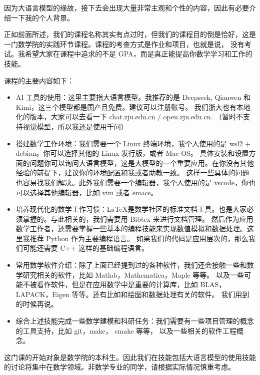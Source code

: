 \documentclass{ctexbook}
\numberwithin{theorem}{chapter}
\begin{document}
因为大语言模型的缘故，接下去会出现大量非常主观和个性的内容，因此有必要介绍一下我的个人背景。

正如前面所述，我们的课程名称其实有点过时，但我们的课程目的倒是恰好，这是一门数学院的实践环节课程。课程的考查方式是作业和项目，也就是说，
没有考试。我希望大家在课程中追求的不是 GPA，而是真正能提高你数学学习和工作的技能。

课程的主要内容如下：
\begin{itemize}
  \item AI 工具的使用：这里主要指大语言模型。我推荐的是 Deepseek, Qianwen 和 Kimi，这三个模型都是国产且免费。建议可以注册账号。
  我们浙大也有本地化的版本，大家可以去看一下 chat.zju.edu.cn / open.zju.edu.cn. （暂时不支持视觉模型，所以我还是使用千问）
  \item 搭建数学工作环境：我们需要一个 Linux 终端环境，我个人使用的是 wsl2 + debian。你可以选择其他的 Linux 发行版，或者 Mac OS。
  具体安装和设置方面的问题你可以询问大语言模型，这是大模型的一个重要应用。在你没有其他经验的前提下，建议你的环境配置和我或者助教一致。
  这样一些具体的问题也容易找我们解决。此外我们需要一个编辑器，我个人使用的是 vscode，你也可以选择其他编辑器，比如 vim 或者 emacs。  
  \item 培养现代化的数学工作习惯：\LaTeX 是数学社区的标准文档工具。也是大家必须掌握的。与此相关的，我们需要用 Bibtex 来进行文档管理。
  然后作为应用数学工作者，还需要掌握一些基本的编程技能来实现数值模拟和数据处理。这里我推荐 Python 作为主要编程语言。
  如果我们的代码是应用层次的，那么我们可能还需要 C++ 这样的基础编程语言。
  \item 常用数学软件介绍：除了上面已经提到过的各种软件，我们还会接触一些和数学研究相关的软件，比如 Matlab，Mathematica，Maple 等等。
  以及一些可能不被看作软件，但是在应用数学中是重要的计算库，比如 BLAS，LAPACK，Eigen 等等。还有比如和绘图和数据处理有关的软件。
  我们用到的时候再说。
  \item 综合上述技能完成一些数学建模和科研任务：我们需要有一些项目管理的概念的工具支持，比如 git，make， cmake 等等，
  以及一些相关的软件工程概念。
\end{itemize}

这门课的开始对象是数学院的本科生。因此我们在技能包括大语言模型的使用技能的讨论将集中在数学领域。非数学专业的同学，请根据实际情况慎重考虑。


\end{document}
